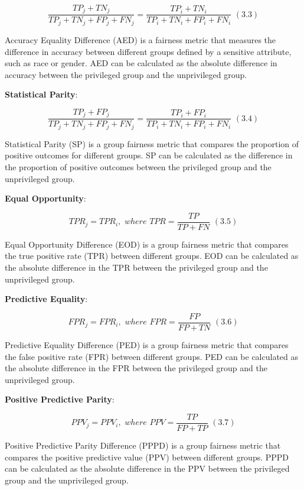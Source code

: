\documentclass[a4paper, 12pt]{article}
\begin{document}
\[ \frac{TP_{j} + TN_{j}}{TP_{j} + TN_{j} + FP_{j} + FN_{j}} = \frac{TP_{i} + TN_{i}}{TP_{i} + TN_{i} + FP_{i} + FN_{i}} \,\, (3.3)\]  

\bigbreak
Accuracy Equality Difference (AED) is a fairness metric that measures the difference in accuracy between different groups defined by a sensitive attribute, such as race or gender. AED can be calculated as the absolute difference in accuracy between the privileged group and the unprivileged group.

\bigbreak
\textbf{Statistical Parity}:

\[ \frac{TP_{j} + FP_{j}}{TP_{j} + TN_{j} + FP_{j} + FN_{j}} = \frac{TP_{i} + FP_{i}}{TP_{i} + TN_{i} + FP_{i} + FN_{i}} \,\, (3.4) \]

\bigbreak
Statistical Parity (SP) is a group fairness metric that compares the proportion of positive outcomes for different groups. SP can be calculated as the difference in the proportion of positive outcomes between the privileged group and the unprivileged group.

\bigbreak
\textbf{Equal Opportunity}:

\[ TPR_{j} = TPR_{i}, \,\, where \,\, TPR = \frac{TP}{TP + FN} \,\, (3.5) \]

\bigbreak
Equal Opportunity Difference (EOD) is a group fairness metric that compares the true positive rate (TPR) between different groups. EOD can be calculated as the absolute difference in the TPR between the privileged group and the unprivileged group.

\bigbreak
\textbf{Predictive Equality}:

\[ FPR_{j} = FPR_{i}, \,\, where \,\, FPR = \frac{FP}{FP + TN} \,\, (3.6) \]

\bigbreak

Predictive Equality Difference (PED) is a group fairness metric that compares the false positive rate (FPR) between different groups. PED can be calculated as the absolute difference in the FPR between the privileged group and the unprivileged group.

\bigbreak
\textbf{Positive Predictive Parity}:

\[ PPV_{j} = PPV_{i}, \,\, where \,\, PPV = \frac{TP}{FP + TP} \,\, (3.7) \]

\bigbreak

Positive Predictive Parity Difference (PPPD) is a group fairness metric that compares the positive predictive value (PPV) between different groups. PPPD can be calculated as the absolute difference in the PPV between the privileged group and the unprivileged group.
\end{document}
